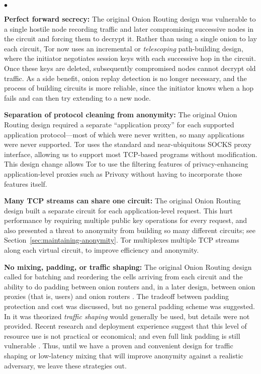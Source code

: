\documentclass[times,10pt,twocolumn]{article}
\newenvironment{tightlist}{\begin{list}{$\bullet$}{
  \setlength{\itemsep}{0mm}
    \setlength{\parsep}{0mm}
    }}{\end{list}}
\begin{document}
\begin{tightlist}

\item \textbf{Perfect forward secrecy:} The original Onion Routing
design was vulnerable to a single hostile node recording traffic and later
compromising successive nodes in the circuit and forcing them to
decrypt it. 
Rather than using a single onion to lay each circuit,
Tor now uses an incremental or \emph{telescoping}
path-building design, where the initiator negotiates session keys with
each successive hop in the circuit.  Once these keys are deleted,
subsequently compromised nodes cannot decrypt old traffic.
As a side benefit, onion replay detection is no longer
necessary, and the process of building circuits is more reliable, since
the initiator knows when a hop fails and can then try extending to a new node.


\item \textbf{Separation of protocol cleaning from anonymity:}
The original Onion Routing design required a separate ``application
proxy'' for each
supported application protocol---most
of which were never written, so many applications were never supported.
Tor uses the standard and near-ubiquitous SOCKS
\cite{socks4,socks5} proxy interface, allowing us to support most TCP-based
programs without modification.  This design change allows Tor to
use the filtering features of privacy-enhancing
application-level proxies such as Privoxy \cite{privoxy} without having to
incorporate those features itself.

\item \textbf{Many TCP streams can share one circuit:} The original
Onion Routing design built a separate circuit for each application-level
request.
This hurt performance by requiring multiple public key operations for
every request, and also presented
a threat to anonymity from building so many different circuits; see
Section~\ref{sec:maintaining-anonymity}.
Tor multiplexes multiple TCP streams along each virtual
circuit, to improve efficiency and anonymity.

\item \textbf{No mixing, padding, or traffic shaping:} The original
Onion Routing design called for batching and reordering the cells arriving
from each circuit and the ability to do padding between onion routers and,
in a later design, between onion
proxies (that is, users) and onion routers \cite{or-ih96,or-jsac98}.
The tradeoff between padding protection and cost was discussed, but no
general padding scheme was suggested. In
\cite{or-pet00} it was theorized \emph{traffic shaping} would generally
be used, but details were not provided.
Recent research \cite{econymics} and deployment
experience \cite{freedom21-security} suggest that this level of resource
use is not practical or economical; and even full link padding is still
vulnerable \cite{defensive-dropping}. Thus, until we have a proven and
convenient design for traffic shaping or low-latency mixing that
will improve anonymity against a realistic adversary, we leave these
strategies out.


\end{tightlist}
\end{document}
